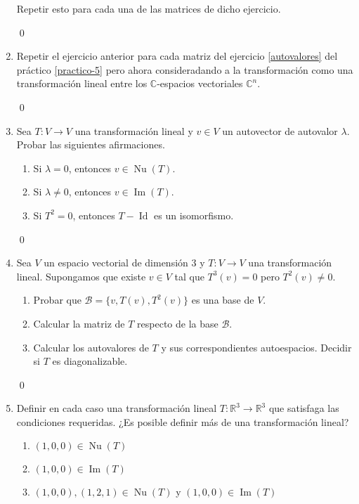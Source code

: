 \begin{enumerate}[topsep=6pt, itemsep=.4cm]
Repetir esto para cada una de las matrices de dicho ejercicio.

\rta


\qed



\item Repetir el ejercicio anterior para cada matriz del ejercicio \ref{autovalores} del práctico \ref{practico-5} pero ahora consideradando a la transformación como una transformación lineal entre los $\mathbb{C}$-espacios vectoriales $\mathbb{C}^n$.

\rta


\qed



\item Sea $T:V\longrightarrow V$ una transformación lineal y $v\in V$ un autovector de autovalor $\lambda$. Probar las siguientes afirmaciones.
\begin{enumerate}
    \item\label{autovalor-autovector-a} Si $\lambda=0$, entonces $v\in\operatorname{Nu}(T)$.
    \item\label{autovalor-autovector-b} Si $\lambda\neq0$, entonces $v\in\operatorname{Im}(T)$.
    \item\label{autovalor-autovector-c} Si $T^2=0$, entonces $T-\operatorname{Id}$ es un isomorfismo.
\end{enumerate}

\rta


\qed



\item\label{base nilp}  Sea $V$ un espacio vectorial de dimensión $3$ y $T:V\longrightarrow V$ una transformación lineal. Supongamos que existe $v\in V$ tal que $T^3(v)=0$ pero $T^2(v)\neq0$.
\begin{enumerate}
    \item\label{base nilp a}  Probar que $\mathcal{B}=\{v,T(v),T^2(v)\}$ es una base de $V$.
    \item\label{base nilp b} Calcular la matriz de $T$ respecto de la base $\mathcal{B}$.
    \item\label{base nilp c} Calcular los autovalores de $T$ y sus correspondientes autoespacios. Decidir si $T$ es diagonalizable.
\end{enumerate}

\rta


\qed


        
\item Definir en cada caso una transformación lineal $T:\mathbb{R}^3\longrightarrow\mathbb{R}^3$ que satisfaga las condiciones requeridas. ¿Es posible definir más de una transformación lineal?
\begin{enumerate}
    \item\label{tl-condiciones-a} $(1,0,0)\in \operatorname{Nu}(T)$ 
    \item\label{tl-condiciones-b} $(1,0,0)\in \operatorname{Im}(T)$ 
    \item\label{tl-condiciones-c} $(1,0,0),(1,2,1)\in\operatorname{Nu}(T)$ y $(1,0,0) \in  \operatorname{Im}(T)$
\end{enumerate}


\end{enumerate}
